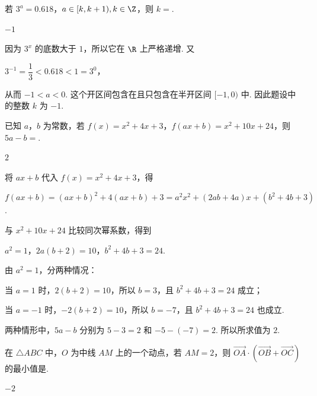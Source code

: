 \begin{problem}
若 \(3^{a} = 0.618\)，\(a \in [k,k+1), k \in \Z\)，则 \(k =\)\fillinblank{}.
\end{problem}

\begin{answer}
\(-1\)
\end{answer}

\begin{solution}
因为 \(3^x\) 的底数大于 \(1\)，所以它在 \(\R\) 上严格递增. 又

\(3^{-1}=\dfrac13<0.618<1=3^0\)，

从而 \(-1<a<0\). 这个开区间包含在且只包含在半开区间 \([-1,0)\) 中. 因此题设中的整数 \(k\) 为 \(-1\).
\end{solution}

\begin{problem}
已知 \(a\)，\(b\) 为常数，若 \(f(x) = x^{2} + 4x + 3\)，\(f(ax + b) = x^{2} + 10x + 24\)，则 \(5a - b =\)\fillinblank{}.
\end{problem}

\begin{answer}
\(2\)
\end{answer}

\begin{solution}
将 \(ax+b\) 代入 \(f(x)=x^2+4x+3\)，得

\(f(ax+b)=(ax+b)^2+4(ax+b)+3=a^2x^2+(2ab+4a)x+(b^2+4b+3)\).

与 \(x^2+10x+24\) 比较同次幂系数，得到

\(a^2=1\)，\(2a(b+2)=10\)，\(b^2+4b+3=24\).

由 \(a^2=1\)，分两种情况：

当 \(a=1\) 时，\(2(b+2)=10\)，所以 \(b=3\)，且 \(b^2+4b+3=24\) 成立；

当 \(a=-1\) 时，\(-2(b+2)=10\)，所以 \(b=-7\)，且 \(b^2+4b+3=24\) 也成立.

两种情形中，\(5a-b\) 分别为 \(5-3=2\) 和 \(-5-(-7)=2\). 所以所求值为 \(2\).
\end{solution}

\begin{problem}
在 \(\triangle ABC\) 中，\(O\) 为中线 \(AM\) 上的一个动点，若 \(AM = 2\)，则 \(\overrightarrow{OA} \cdot (\overrightarrow{OB} + \overrightarrow{OC})\) 的最小值是\fillinblank{}.
\end{problem}

\begin{answer}
\(-2\)
\end{answer}

